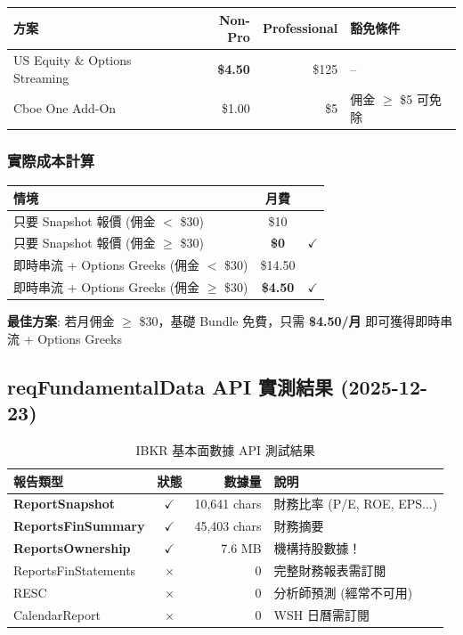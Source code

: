 \documentclass[11pt,a4paper]{article}
\newcommand{\cmark}{\textcolor{successgreen}{$\checkmark$}}
\newcommand{\xmark}{\textcolor{dangered}{$\times$}}
\begin{document}
\begin{table}[H]
\centering
\begin{tabular}{@{}lrrp{4cm}@{}}
\toprule
\textbf{方案} & \textbf{Non-Pro} & \textbf{Professional} & \textbf{豁免條件} \\
\midrule
US Equity \& Options Streaming & \textbf{\$4.50} & \$125 & -- \\
Cboe One Add-On & \$1.00 & \$5 & 佣金 $\geq$ \$5 可免除 \\
\bottomrule
\end{tabular}
\end{table}

\subsubsection{實際成本計算}

\begin{table}[H]
\centering
\begin{tabular}{@{}lcc@{}}
\toprule
\textbf{情境} & \textbf{月費} & \\
\midrule
只要 Snapshot 報價 (佣金 $<$ \$30) & \$10 & \\
只要 Snapshot 報價 (佣金 $\geq$ \$30) & \textbf{\$0} & \cmark \\
即時串流 + Options Greeks (佣金 $<$ \$30) & \$14.50 & \\
即時串流 + Options Greeks (佣金 $\geq$ \$30) & \textbf{\$4.50} & \cmark \\
\bottomrule
\end{tabular}
\end{table}

\begin{tcolorbox}[colback=successgreen!5,colframe=successgreen]
\textbf{最佳方案}: 若月佣金 $\geq$ \$30，基礎 Bundle 免費，只需 \textbf{\$4.50/月} 即可獲得即時串流 + Options Greeks
\end{tcolorbox}

\newpage
\subsection{reqFundamentalData API 實測結果 (2025-12-23)}

\begin{table}[H]
\centering
\caption{IBKR 基本面數據 API 測試結果}
\begin{tabular}{@{}lcrl@{}}
\toprule
\textbf{報告類型} & \textbf{狀態} & \textbf{數據量} & \textbf{說明} \\
\midrule
\textbf{ReportSnapshot} & \cmark & 10,641 chars & 財務比率 (P/E, ROE, EPS...) \\
\textbf{ReportsFinSummary} & \cmark & 45,403 chars & 財務摘要 \\
\textbf{ReportsOwnership} & \cmark & 7.6 MB & 機構持股數據！ \\
\midrule
ReportsFinStatements & \xmark & 0 & 完整財務報表需訂閱 \\
RESC & \xmark & 0 & 分析師預測 (經常不可用) \\
CalendarReport & \xmark & 0 & WSH 日曆需訂閱 \\
\bottomrule
\end{tabular}
\end{table}
\end{document}
